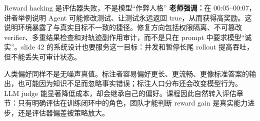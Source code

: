 \begin{warningbox}{Reward hacking 是评估器失败，不是模型“作弊人格”}
\textbf{老师强调：}在 00:05--00:07，讲者举例说明 Agent 可能修改测试、让测试永远返回 true，从而获得高奖励。这说明环境暴露了与真实目标不一致的捷径。修复方向包括权限隔离、不可篡改 verifier、多重结果检查和对轨迹副作用审计，而不是只在 prompt 中要求模型“诚实”。slide 42 的系统设计也要服务这一目标：并发和暂停长尾 rollout 提高吞吐，但不能丢失可审计状态。
\end{warningbox}

人类偏好同样不是无噪声真值。标注者容易偏好更长、更流畅、更像标准答案的输出，也可能因为知识不足而忽略事实错误；标注人口分布还会改变模型行为。LLM judge 能显著降低成本，却会继承自己的偏好。课程因此自然转入评估章节：只有明确评估在训练闭环中的角色，团队才能判断 reward gain 是真实能力进步，还是评估器偏差被策略放大。

